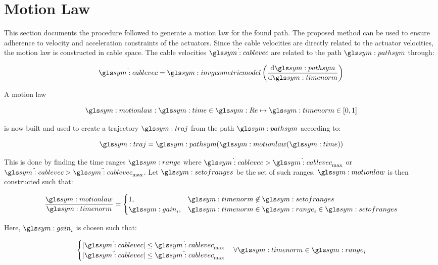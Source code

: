 \section{Motion Law}

	This section documents the procedure followed to generate a motion law for
	the found path. The proposed method can be used to ensure adherence to
	velocity and acceleration constraints of the actuators. Since the cable
	velocities are directly related to the actuator velocities, the motion law
	is constructed in cable space. The cable velocities $\dot{\cablevec}$ are
	related to the path $\pathsym$ through:

	\begin{equation}
		\dot{\cablevec} = \invgeometricmodel
							\left(
								\frac
								{
									\der \pathsym
								}
								{
									\der \timenorm
								}
							\right)
	\end{equation}

	A motion law

	\begin{equation}
		\motionlaw : \timesym \in \Re \mapsto \timenorm \in [0, 1]
	\end{equation}

	is now built and used to create a trajectory $\traj$ from the
	path $\pathsym$ according to:

	\begin{equation}
		\traj = \pathsym(\motionlaw(\timesym))
	\end{equation}

	This is done by finding the time ranges $\range$ where $\dot{\cablevec} >
	\dot{\cablevec}_{\max}$ or $\ddot{\cablevec} > \ddot{\cablevec}_{\max}$. Let
	$\setofranges$ be the set of such ranges. $\motionlaw$ is then constructed
	such that:

	\begin{equation}
		\frac
		{
			\motionlaw
		}
		{
			\timenorm
		}
		=
		\begin{cases}
			1,			&\timenorm \not\in \setofranges\\
			\gain_i,	&\timenorm \in \range_i \in \setofranges
		\end{cases}
		\label{eq:motion_law_construction}
	\end{equation}

	Here, $\gain_i$ is chosen such that:

	\begin{equation}
		\begin{cases}
			|\dot{\cablevec}| \leq \dot{\cablevec}_{\max}\\
			|\ddot{\cablevec}| \leq \ddot{\cablevec}_{\max}\\
		\end{cases}
			\forall\timenorm\in\range_i
	\end{equation}

